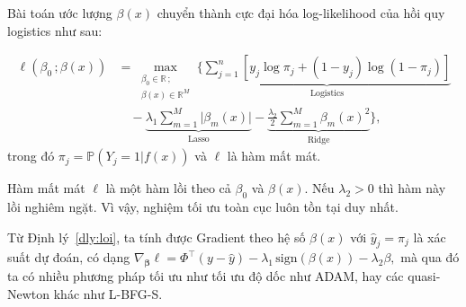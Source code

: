 \documentclass[a4paper,oneside]{book} %
\theoremstyle{plain}
\theoremstyle{plain}
\theoremstyle{nonumberplain}
\begin{document}
Bài toán ước lượng $\beta(x)$ chuyển thành cực đại hóa log-likelihood của hồi quy logistics như sau:

\begin{align}
	\ell(\beta_0\,;\beta(x))
	&= \max_{\substack{\beta_0\in\mathbb{R}\,;\\\beta(x)\in\mathbb{R}^M}}
	\Bigg\{
	\underbrace{\sum_{j=1}^n \left[y_j \log \pi_j + (1 - y_j)\log (1 - \pi_j)\right]}_{\text{Logistics}} \nonumber\\
	&\quad
	- \underbrace{\lambda_1\sum_{m=1}^M\vert\beta_m(x)\vert}_{\text{Lasso}}
	- \underbrace{\frac{\lambda_2}{2}\sum_{m=1}^M\beta_m(x)^2}_{\text{Ridge}}
	\Bigg\},
\end{align}
trong đó $\pi _j = {\mathbb {P}}(Y_j = 1 \vert f(x))$ và $\ell$ là hàm mất mát.

\begin{theorem}\label{dly:loi}
	Hàm mất mát $\ell$ là một hàm lồi theo cả $\beta_0$ và $\beta(x)$. Nếu $\lambda_2 > 0$ thì hàm này lồi nghiêm ngặt. Vì vậy, nghiệm tối ưu toàn cục luôn tồn tại duy nhất.
\end{theorem}

Từ Định lý~\ref{dly:loi}, ta tính được Gradient theo hệ số $\beta(x)$ với $\hat{y}_j = \pi_j$ là xác suất dự đoán, có dạng
	$
	\nabla_{\bm\beta} \ell = \Phi^\intercal (y - \hat{y}) - \lambda_1 \,\text{sign}(\beta(x)) - \lambda_2 \beta,
	$
mà qua đó ta có nhiều phương pháp tối ưu như tối ưu độ dốc như ADAM, hay các quasi-Newton khác như L-BFG-S.
\end{document}
